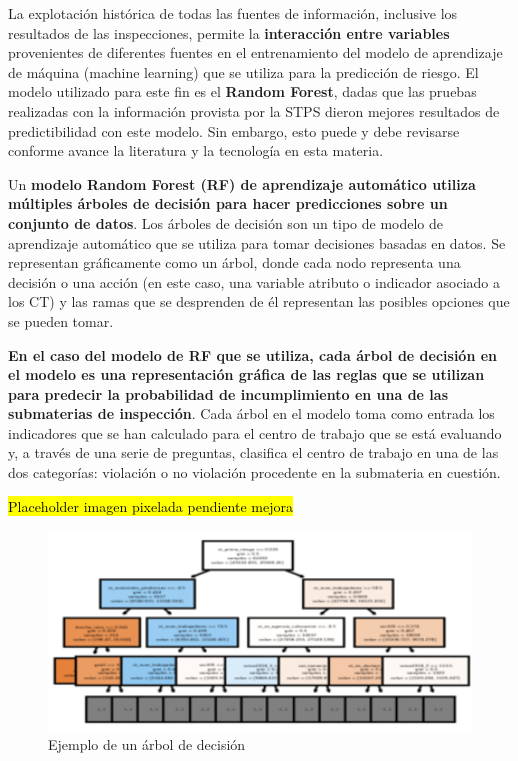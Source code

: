 \documentclass[
]{article}
\begin{document}
La explotación histórica de todas las fuentes de información, inclusive los resultados de las inspecciones, permite la \textbf{interacción entre variables} provenientes de diferentes fuentes en el entrenamiento del modelo de aprendizaje de máquina (machine learning) que se utiliza para la predicción de riesgo. El modelo utilizado para este fin es el \textbf{Random Forest}, dadas que las pruebas realizadas con la información provista por la STPS dieron mejores resultados de predictibilidad con este modelo. Sin embargo, esto puede y debe revisarse conforme avance la literatura y la tecnología en esta materia.

Un \textbf{modelo Random Forest (RF) de aprendizaje automático utiliza múltiples árboles de decisión para hacer predicciones sobre un conjunto de datos}. Los árboles de decisión son un tipo de modelo de aprendizaje automático que se utiliza para tomar decisiones basadas en datos. Se representan gráficamente como un árbol, donde cada nodo representa una decisión o una acción (en este caso, una variable atributo o indicador asociado a los CT) y las ramas que se desprenden de él representan las posibles opciones que se pueden tomar.

\textbf{En el caso del modelo de RF que se utiliza, cada árbol de decisión en el modelo es una representación gráfica de las reglas que se utilizan para predecir la probabilidad de incumplimiento en una de las submaterias de inspección}. Cada árbol en el modelo toma como entrada los indicadores que se han calculado para el centro de trabajo que se está evaluando y, a través de una serie de preguntas, clasifica el centro de trabajo en una de las dos categorías: violación o no violación procedente en la submateria en cuestión.

\hl{Placeholder imagen pixelada pendiente mejora}

\begin{figure}
\includegraphics[width=5.26in]{images-1/02/arbol_decision} \caption{Ejemplo de un árbol de decisión}\label{fig:arboldecision}
\end{figure}
\end{document}
